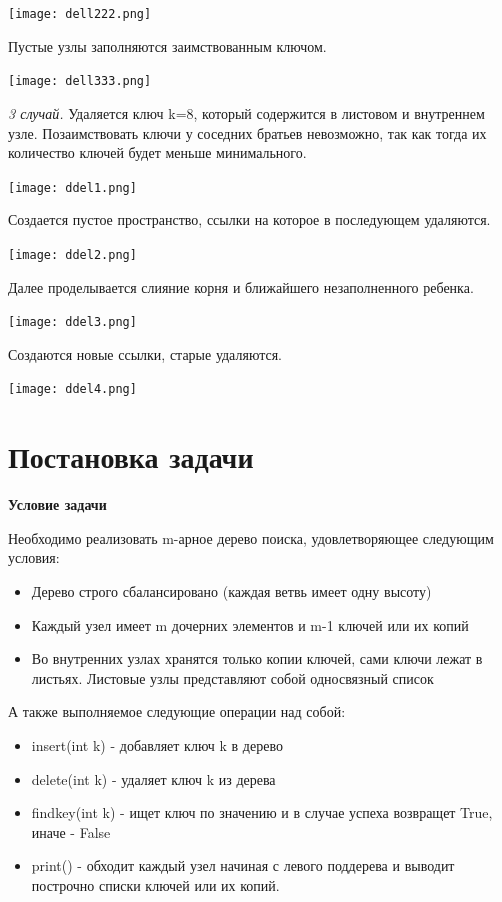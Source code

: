 \documentclass{article}
\begin{document}
\texttt{[image: dell222.png]}

Пустые узлы заполняются заимствованным ключом.

\texttt{[image: dell333.png]}

\textit{3 случай.} Удаляется ключ k=8, который содержится в листовом и внутреннем узле. Позаимствовать ключи у соседних братьев невозможно, так как тогда их количество ключей будет меньше минимального. 

\texttt{[image: ddel1.png]}

Создается пустое пространство, ссылки на которое в последующем удаляются.

\texttt{[image: ddel2.png]}

Далее проделывается слияние корня и ближайшего незаполненного ребенка.

\texttt{[image: ddel3.png]}

Создаются новые ссылки, старые удаляются.

\texttt{[image: ddel4.png]}


 
\section{Постановка задачи}
\textbf{Условие задачи} 

Необходимо реализовать m-арное дерево поиска, удовлетворяющее следующим условия:
\begin{itemize}
\item Дерево строго сбалансировано (каждая ветвь имеет одну высоту)
\item Каждый узел имеет m дочерних элементов и m-1 ключей или их копий
\item Во внутренних узлах хранятся только копии ключей, сами ключи лежат в листьях. Листовые узлы представляют собой односвязный список
\end{itemize}

А также выполняемое следующие операции над собой:
\begin{itemize}
    \item insert(int k) - добавляет ключ k в дерево
    \item delete(int k) - удаляет ключ k из дерева
    \item findkey(int k) - ищет ключ по значению и в случае успеха возвращет True, иначе - False
    \item print() - обходит каждый узел начиная с левого поддерева и выводит построчно списки ключей или их копий.
\end{itemize}
\end{document}
